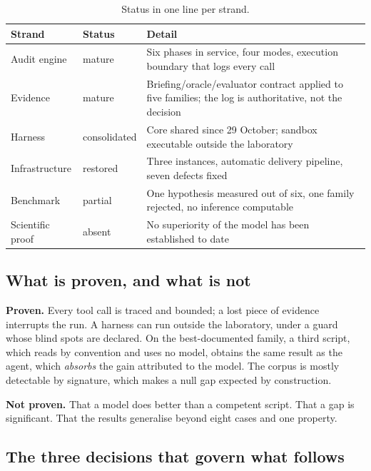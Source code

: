 \begin{table}[H]
\centering
\caption{Status in one line per strand.}
\label{tab:etat-volet}
\small
\begin{tabular}{@{}p{3.3cm}p{1.9cm}p{8.3cm}@{}}
\toprule
Strand & Status & Detail \\
\midrule
Audit engine & mature & Six phases in service, four modes, execution boundary that logs every call \\
Evidence & mature & Briefing/oracle/evaluator contract applied to five families; the log is authoritative, not the decision \\
Harness & consolidated & Core shared since 29 October; sandbox executable outside the laboratory \\
Infrastructure & restored & Three instances, automatic delivery pipeline, seven defects fixed \\
Benchmark & partial & One hypothesis measured out of six, one family rejected, no inference computable \\
Scientific proof & absent & No superiority of the model has been established to date \\
\bottomrule
\end{tabular}
\end{table}

\subsection{What is proven, and what is not}

\textbf{Proven.} Every tool call is traced and bounded; a lost piece of evidence
interrupts the run. A harness can run outside the laboratory, under a guard whose
blind spots are declared. On the best-documented family, a third script, which
reads by convention and uses no model, obtains the same result as the agent,
which \emph{absorbs} the gain attributed to the model. The corpus is mostly
detectable by signature, which makes a null gap expected by construction.

\textbf{Not proven.} That a model does better than a competent script. That a gap
is significant. That the results generalise beyond eight cases and one property.

\subsection{The three decisions that govern what follows}


